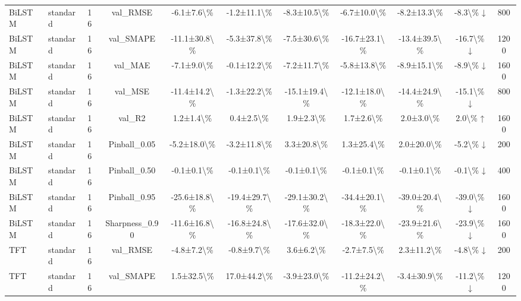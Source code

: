 \begin{table}
{\begin{tabular}{lllcccccccc}
BiLSTM & standard & 16 & val\_RMSE & -6.1±7.6\textbackslash \% & -1.2±11.1\textbackslash \% & -8.3±10.5\textbackslash \% & -6.7±10.0\textbackslash \% & -8.2±13.3\textbackslash \% & -8.3\textbackslash \% ↓ & 800 \\
BiLSTM & standard & 16 & val\_SMAPE & -11.1±30.8\textbackslash \% & -5.3±37.8\textbackslash \% & -7.5±30.6\textbackslash \% & -16.7±23.1\textbackslash \% & -13.4±39.5\textbackslash \% & -16.7\textbackslash \% ↓ & 1200 \\
BiLSTM & standard & 16 & val\_MAE & -7.1±9.0\textbackslash \% & -0.1±12.2\textbackslash \% & -7.2±11.7\textbackslash \% & -5.8±13.8\textbackslash \% & -8.9±15.1\textbackslash \% & -8.9\textbackslash \% ↓ & 1600 \\
BiLSTM & standard & 16 & val\_MSE & -11.4±14.2\textbackslash \% & -1.3±22.2\textbackslash \% & -15.1±19.4\textbackslash \% & -12.1±18.0\textbackslash \% & -14.4±24.9\textbackslash \% & -15.1\textbackslash \% ↓ & 800 \\
BiLSTM & standard & 16 & val\_R2 & 1.2±1.4\textbackslash \% & 0.4±2.5\textbackslash \% & 1.9±2.3\textbackslash \% & 1.7±2.6\textbackslash \% & 2.0±3.0\textbackslash \% & 2.0\textbackslash \% ↑ & 1600 \\
BiLSTM & standard & 16 & Pinball\_0.05 & -5.2±18.0\textbackslash \% & -3.2±11.8\textbackslash \% & 3.3±20.8\textbackslash \% & 1.3±25.4\textbackslash \% & 2.0±20.0\textbackslash \% & -5.2\textbackslash \% ↓ & 200 \\
BiLSTM & standard & 16 & Pinball\_0.50 & -0.1±0.1\textbackslash \% & -0.1±0.1\textbackslash \% & -0.1±0.1\textbackslash \% & -0.1±0.1\textbackslash \% & -0.1±0.1\textbackslash \% & -0.1\textbackslash \% ↓ & 400 \\
BiLSTM & standard & 16 & Pinball\_0.95 & -25.6±18.8\textbackslash \% & -19.4±29.7\textbackslash \% & -29.1±30.2\textbackslash \% & -34.4±20.1\textbackslash \% & -39.0±20.4\textbackslash \% & -39.0\textbackslash \% ↓ & 1600 \\
BiLSTM & standard & 16 & Sharpness\_0.90 & -11.6±16.8\textbackslash \% & -16.8±24.8\textbackslash \% & -17.6±32.0\textbackslash \% & -18.3±22.0\textbackslash \% & -23.9±21.6\textbackslash \% & -23.9\textbackslash \% ↓ & 1600 \\
TFT & standard & 16 & val\_RMSE & -4.8±7.2\textbackslash \% & -0.8±9.7\textbackslash \% & 3.6±6.2\textbackslash \% & -2.7±7.5\textbackslash \% & 2.3±11.2\textbackslash \% & -4.8\textbackslash \% ↓ & 200 \\
TFT & standard & 16 & val\_SMAPE & 1.5±32.5\textbackslash \% & 17.0±44.2\textbackslash \% & -3.9±23.0\textbackslash \% & -11.2±24.2\textbackslash \% & -3.4±30.9\textbackslash \% & -11.2\textbackslash \% ↓ & 1200 \\

\end{tabular}}
\end{table}
